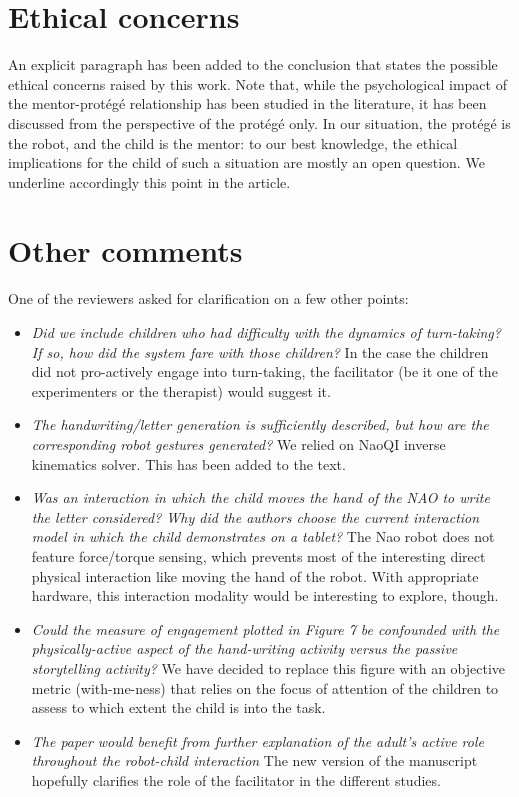 \documentclass{article}
\begin{document}
\section*{Ethical concerns}

An explicit paragraph has been added to the conclusion that states the possible
ethical concerns raised by this work. Note that, while the psychological impact of the
mentor-protégé relationship has been studied in the literature, it has been
discussed from the perspective of the protégé only. In our situation, the protégé
is the robot, and the child is the mentor: to our best knowledge, the ethical
implications for the child of such a situation are mostly an open question. We
underline accordingly this point in the article.

\section*{Other comments}

One of the reviewers asked for clarification on a few other points:

\begin{itemize}

\item \emph{Did we include children who had difficulty with the dynamics of
turn-taking? If so, how did the system fare with those children?} In the case
the children did not pro-actively engage into turn-taking, the facilitator (be
it one of the experimenters or the therapist) would suggest it.

\item \emph{The handwriting/letter generation is sufficiently described, but
how are the corresponding robot gestures generated?} We relied on NaoQI inverse
kinematics solver. This has been added to the text.

\item \emph{Was an interaction in which the child moves the hand of the NAO to
write the letter considered? Why did the authors choose the current interaction
model in which the child demonstrates on a tablet?} The Nao robot does not
feature force/torque sensing, which prevents most of the interesting direct
physical interaction like moving the hand of the robot. With appropriate
hardware, this interaction modality would be interesting to explore, though.

\item \emph{Could the measure of engagement plotted in Figure 7 be confounded
with the physically-active aspect of the hand-writing activity versus the
passive storytelling activity?} We have decided to replace this figure with an
objective metric (with-me-ness) that relies on the focus of attention of the
children to assess to which extent the child is into the task.

\item \emph{The paper would benefit from further explanation of the adult's
active role throughout the robot-child interaction} The new version of the manuscript hopefully
clarifies the role of the facilitator in the different studies.

\end{itemize}
\end{document}
